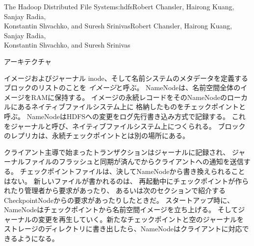 \begin{aosachaptertoc}{The Hadoop Distributed File System}{s:hdfs}{Robert Chansler, Hairong Kuang, Sanjay Radia, \\ Konstantin Shvachko, and Suresh Srinivas}{Robert Chansler, Hairong Kuang, Sanjay Radia, \\ \hspace*{0.9cm} Konstantin Shvachko, and Suresh Srinivas}
\begin{aosasect1}{アーキテクチャ}
\begin{aosasect2}{イメージおよびジャーナル}
inode、そして名前システムのメタデータを定義するブロックのリストのことを
\emph{イメージ}と呼ぶ。
NameNodeは、名前空間全体のイメージをRAMに保持する。
イメージの永続レコードをそのNameNodeのローカルにあるネイティブファイルシステム上に
格納したものをチェックポイントと呼ぶ。
NameNodeはHDFSへの変更をログ先行書き込み方式で記録する。
これをジャーナルと呼び、ネイティブファイルシステム上につくられる。
ブロックのレプリカは、永続チェックポイントとは別の場所にある。

クライアント主導で始まったトランザクションはジャーナルに記録され、
ジャーナルファイルのフラッシュと同期が済んでからクライアントへの通知を送信する。
チェックポイントファイルは、決してNameNodeから書き換えられることはない。
新しいファイルが書かれるのは、
再起動中にチェックポイントが作られたり管理者から要求があったり、
あるいは次のセクションで紹介するCheckpointNodeからの要求があったりしたときだ。
スタートアップ時に、NameNodeはチェックポイントから名前空間イメージを立ち上げる。
そしてジャーナルの変更を再生していく。新たなチェックポイントと空のジャーナルを
ストレージのディレクトリに書き出したら、NameNodeはクライアントに対応できるようになる。


\end{aosasect2}
\end{aosasect1}
\end{aosachaptertoc}
